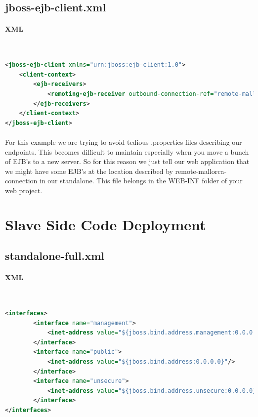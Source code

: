 \documentclass[
10pt, %
letterpaper, %
oneside, %
headinclude,footinclude, %
BCOR5mm, %
]{scrartcl}
\begin{document}

\subsection{jboss-ejb-client.xml}


\paragraph{XML}~
\begin{lstlisting}[language=XML]
<jboss-ejb-client xmlns="urn:jboss:ejb-client:1.0">
	<client-context>
		<ejb-receivers>
			<remoting-ejb-receiver outbound-connection-ref="remote-mallorca-connection"/>
		</ejb-receivers>
	</client-context>
</jboss-ejb-client>
\end{lstlisting}

\paragraph{} For this example we are trying to avoid tedious .properties files describing our endpoints. This becomes difficult to maintain especially when you move a bunch of EJB's to a new server. So for this reason we just tell our web application that we might have some EJB's at the location described by remote-mallorca-connection in our standalone. This file belongs in the WEB-INF folder of your web project.



\section{Slave Side Code Deployment}



\subsection{standalone-full.xml}


\paragraph{XML}~
\begin{lstlisting}[language=XML]
<interfaces>
        <interface name="management">
            <inet-address value="${jboss.bind.address.management:0.0.0.0}"/>
        </interface>
        <interface name="public">
            <inet-address value="${jboss.bind.address:0.0.0.0}"/>
        </interface>
        <interface name="unsecure">
            <inet-address value="${jboss.bind.address.unsecure:0.0.0.0}"/>
        </interface>
</interfaces>
\end{lstlisting}
 
\end{document}
